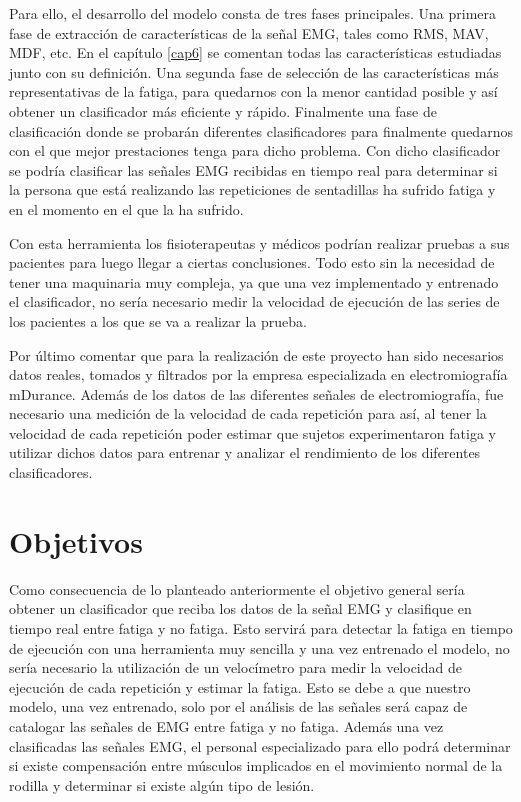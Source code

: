 Para ello, el desarrollo del modelo consta de tres fases principales. Una primera fase de extracción de características de la señal EMG, tales como RMS, MAV, MDF, etc. En el capítulo \ref{cap6} se comentan todas las características estudiadas junto con su definición. Una segunda fase de selección de las características más representativas de la fatiga, para quedarnos con la menor cantidad posible y así obtener un clasificador más eficiente y rápido. Finalmente una fase de clasificación donde se probarán diferentes clasificadores para finalmente quedarnos con el que mejor prestaciones tenga para dicho problema. 
Con dicho clasificador se podría clasificar las señales EMG recibidas en tiempo real para determinar si la persona que está realizando las repeticiones de sentadillas ha sufrido fatiga y en el momento en el que la ha sufrido. 

Con esta herramienta los fisioterapeutas y médicos podrían realizar pruebas a sus pacientes para luego llegar a ciertas conclusiones. Todo esto sin la necesidad de tener una maquinaria muy compleja, ya que una vez implementado y entrenado el clasificador, no sería necesario medir la velocidad de ejecución de las series de los pacientes a los que se va a realizar la prueba.

Por último comentar que para la realización de este proyecto han sido necesarios datos reales, tomados y filtrados por la empresa especializada en electromiografía mDurance. Además de los datos de las diferentes señales de electromiografía, fue necesario una medición de la velocidad de cada repetición para así, al tener la velocidad de cada repetición poder estimar que sujetos experimentaron fatiga y utilizar dichos datos para entrenar y analizar el rendimiento de los diferentes clasificadores.
\section{Objetivos\label{objetivos}}

Como consecuencia de lo planteado anteriormente el objetivo general sería obtener un clasificador que reciba los datos de la señal EMG y clasifique en tiempo real entre fatiga y no fatiga. Esto servirá para detectar la fatiga en tiempo de ejecución con una herramienta muy sencilla y una vez entrenado el modelo, no sería necesario la utilización de un velocímetro para medir la velocidad de ejecución de cada repetición y estimar la fatiga. Esto se debe a que nuestro modelo, una vez entrenado, solo por el análisis de las señales será capaz de catalogar las señales de EMG entre fatiga y no fatiga. Además una vez clasificadas las señales EMG, el personal especializado para ello podrá determinar si existe compensación entre músculos implicados en el movimiento normal de la rodilla y determinar si existe algún tipo de lesión.

